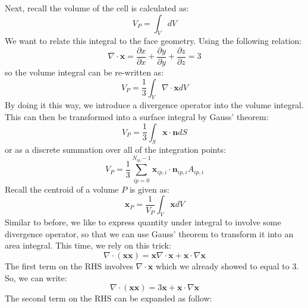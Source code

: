 \documentclass[11pt]{article}
\begin{document}
Next, recall the volume of the cell is calculated as:
\begin{equation*}
V_P = \int_{V}dV
\end{equation*}
We want to relate this integral to the face geometry. Using the following relation:
\begin{equation*}
\nabla \cdot \textbf{x} = \frac{\partial x}{\partial x} + \frac{\partial y}{\partial y}
+ \frac{\partial z}{\partial z} = 3
\end{equation*}
so the volume integral can be re-written as:
\begin{equation*}
V_P = \frac{1}{3}\int_{V}\nabla \cdot \textbf{x} dV
\end{equation*}
By doing it this way, we introduce a divergence operator into the volume integral. This can then be
transformed into a surface integral by Gauss' theorem:
\begin{equation*}
V_P = \frac{1}{3}\int_{S}\textbf{x} \cdot \textbf{n}dS
\end{equation*}
or as a discrete summation over all of the integration points:
\begin{equation*}
V_P = \frac{1}{3}\sum_{ip=0}^{N_{ip}-1}\textbf{x}_{ip,i}\cdot \textbf{n}_{ip,i}A_{ip,i}
\end{equation*}
Recall the centroid of a volume \(P\) is given as:
\begin{equation*}
\textbf{x}_P = \frac{1}{V_P}\int_{V}\textbf{x}dV
\end{equation*}
Similar to before, we like to express quantity under integral to involve some divergence operator, so that
we can use Gauss' theorem to transform it into an area integral. This time, we rely on this trick:
\begin{equation*}
\nabla \cdot (\textbf{x}\textbf{x}) = \textbf{x}\nabla \cdot \textbf{x} + \textbf{x}\cdot \nabla \textbf{x}
\end{equation*}
The first term on the RHS involves \(\nabla \cdot \textbf{x}\) which we already showed to equal to 3.
So, we can write:
\begin{equation*}
\nabla \cdot (\textbf{x}\textbf{x}) = 3\textbf{x} + \textbf{x}\cdot \nabla \textbf{x}
\end{equation*}
The second term on the RHS can be expanded as follow:
\end{document}
